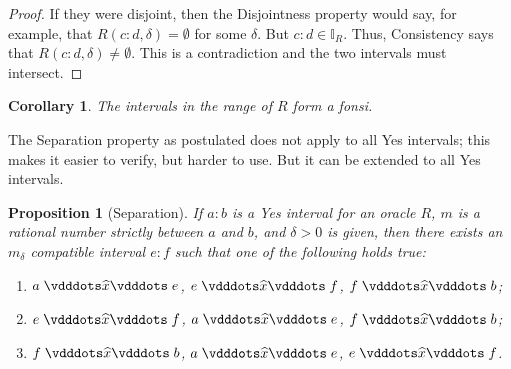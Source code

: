 \documentclass[12pt]{article}
\newtheorem{corollary}{Corollary}[section]
\newtheorem{proposition}{Proposition}[section]
\begin{document}
\begin{proof}
    If they were disjoint, then the Disjointness property would say, for example, that $R(c:d, \delta)= \emptyset$ for some $\delta$. But $c:d \in \mathbb{I}_R$. Thus, Consistency says that $R(c:d, \delta) \neq \emptyset$. This is a contradiction and the two intervals must intersect. 
\end{proof}

\begin{corollary}
    The intervals in the range of $R$ form a fonsi.
\end{corollary}


The Separation property as postulated does not apply to all Yes intervals; this makes it easier to verify, but harder to use. But it can be extended to all Yes intervals.

\begin{proposition}[Separation]
    If $a: b$ is a Yes interval for an oracle $R$, $m$ is a rational number strictly between $a$ and $b$, and $\delta > 0$ is given, then there exists an $m_\delta$ compatible interval $e:f$ such that one of the following holds true:
    \begin{enumerate}
        \item $a \xora e$, \sout{$e\xora f$}, \sout{$f\xora b$};
        \item $e \xora f$, \sout{$a\xora e$}, \sout{$f\xora b$};
        \item $f \xora b$, \sout{$a\xora e$}, \sout{$e\xora f$}.
    \end{enumerate}
\end{proposition}
\end{document}
